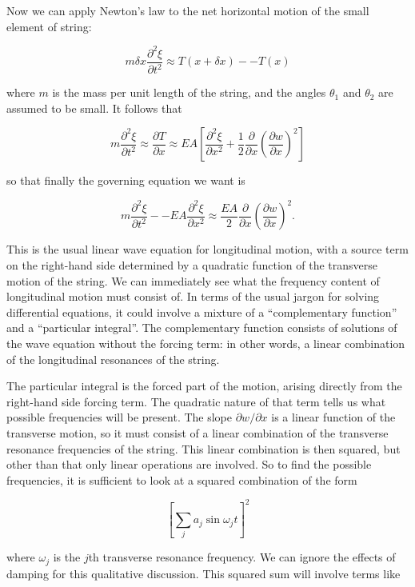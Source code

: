   Now we can apply Newton's law to the net horizontal motion of the small 
  element of string: 

  $$m \delta x \dfrac{\partial^2 \xi}{\partial t^2} \approx T(x+\delta x) -- 
  T(x) \tag{7}$$ 

  where $m$ is the mass per unit length of the string, and the angles 
  $\theta_1$ and $\theta_2$ are assumed to be small. It follows that 

  $$m \dfrac{\partial^2 \xi}{\partial t^2} \approx \dfrac{\partial T}{\partial 
  x} \approx EA\left[ \dfrac{\partial^2 \xi}{\partial x^2} + \dfrac{1}{2} 
  \dfrac{\partial}{\partial x} \left(\dfrac{\partial w}{\partial x}\right)^2 
  \right] \tag{8}$$ 

  so that finally the governing equation we want is 

  $$m \dfrac{\partial^2 \xi}{\partial t^2} -- EA \dfrac{\partial^2 
  \xi}{\partial x^2} \approx \dfrac{EA}{2} \dfrac{\partial}{\partial x} 
  \left(\dfrac{\partial w}{\partial x}\right)^2 . \tag{9}$$ 

  This is the usual linear wave equation for longitudinal motion, with a source 
  term on the right-hand side determined by a quadratic function of the 
  transverse motion of the string. We can immediately see what the frequency 
  content of longitudinal motion must consist of. In terms of the usual jargon 
  for solving differential equations, it could involve a mixture of a 
  ``complementary function'' and a ``particular integral''. The complementary 
  function consists of solutions of the wave equation without the forcing term: 
  in other words, a linear combination of the longitudinal resonances of the 
  string. 

  The particular integral is the forced part of the motion, arising directly 
  from the right-hand side forcing term. The quadratic nature of that term 
  tells us what possible frequencies will be present. The slope $\partial 
  w/\partial x$ is a linear function of the transverse motion, so it must 
  consist of a linear combination of the transverse resonance frequencies of 
  the string. This linear combination is then squared, but other than that only 
  linear operations are involved. So to find the possible frequencies, it is 
  sufficient to look at a squared combination of the form 

  $$\left[\sum_j{a_j \sin \omega_j t} \right]^2 \tag{10}$$ 

  where $\omega_j$ is the $j$th transverse resonance frequency. We can ignore 
  the effects of damping for this qualitative discussion. This squared sum will 
  involve terms like 

